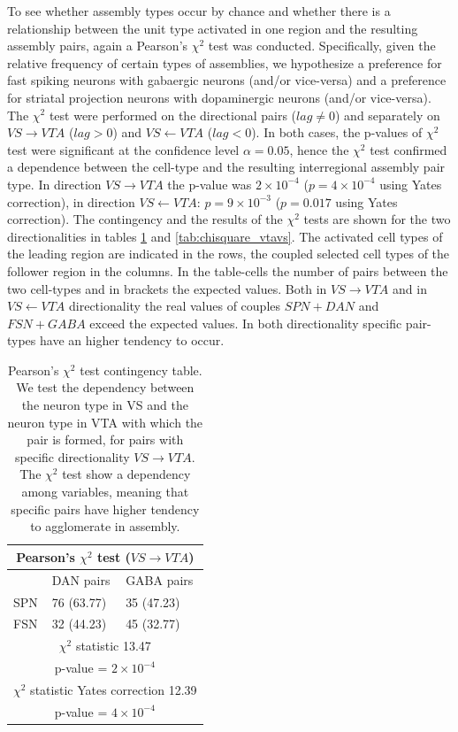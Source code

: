 To see whether assembly types occur by chance and whether there is a relationship between the unit type activated in one region and the resulting assembly pairs, again a Pearson's $\chi^2$ test was conducted. Specifically, given the relative frequency of certain types of assemblies, we hypothesize a preference for fast spiking neurons with gabaergic neurons (and/or vice-versa) and a preference for striatal projection neurons with dopaminergic neurons (and/or vice-versa). The $\chi^2$ test were performed on the directional pairs ($lag\neq0$) and separately on $VS\rightarrow VTA$ ($lag>0$) and $VS\leftarrow VTA$ ($lag<0$). In both cases, the p-values of $\chi^2$ test were significant at the confidence level $\alpha = 0.05$, hence the $\chi^2$ test confirmed a dependence between the cell-type and the resulting interregional assembly pair type. In direction $VS\rightarrow VTA$ the p-value was $2\times10^{-4}$ ($p=4\times10^{-4}$ using Yates correction), in direction $VS\leftarrow VTA$: $p=9\times10^{-3}$ ($p=0.017$ using Yates correction). The contingency and the results of the $\chi^2$ tests are shown for the two directionalities in tables \ref{tab:chisquare_vsvta} and \ref{tab:chisquare_vtavs}. The activated cell types of the leading region are indicated in the rows, the coupled selected cell types of the follower region in the columns. In the table-cells the number of pairs between the two cell-types and in brackets the expected values. Both in $VS\rightarrow VTA$ and in $VS\leftarrow VTA$ directionality the real values of couples $SPN+DAN$ and $FSN+GABA$ exceed the expected values. In both directionality specific pair-types have an higher tendency to occur.\\ 
\begin{table}[H]
\begin{tabular}{ |p{3cm}|p{3cm}|p{3cm}| }
 \hline
 \multicolumn{3}{|c|}{Pearson's $\chi^2$ test ($VS \rightarrow VTA$)} \\
 \hline
 & DAN pairs & GABA pairs\\
 \hline
 SPN & 76 (63.77) & 35 (47.23) \\
 \hline
 FSN & 32 (44.23) & 45 (32.77)\\
 \hline
 \multicolumn{3}{|c|}{$\chi^2$ statistic  13.47}\\
 \multicolumn{3}{|c|}{p-value = $2\times10^{-4}$}\\
 \hline
 \multicolumn{3}{|c|}{$\chi^2$ statistic Yates correction 12.39}\\
 \multicolumn{3}{|c|}{p-value = $4\times10^{-4}$}\\
 \hline
\end{tabular}
\caption{Pearson's $\chi^{2}$ test contingency table. We test the dependency between the neuron type in VS and the neuron type in VTA with which the pair is formed, for pairs with specific directionality $VS \rightarrow VTA$. The $\chi^2$ test show a dependency among variables, meaning that specific pairs have higher tendency to agglomerate in assembly.}
\label{tab:chisquare_vsvta}
\end{table}

